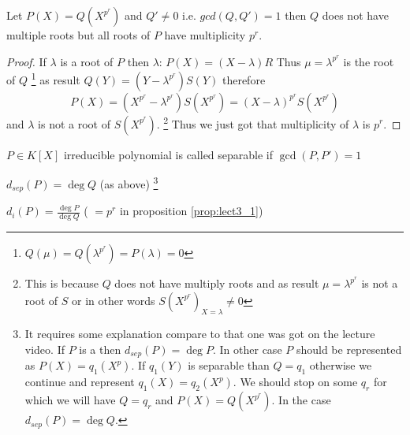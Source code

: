 \begin{proposition}
  Let $P\left(X\right) = Q\left(X^{p^r}\right)$ and $Q' \ne 0$ i.e.
  $gcd(Q, Q') = 1$ then $Q$ does not have multiple roots but
  all roots of $P$ have multiplicity $p^r$.
  \begin{proof}
    If $\lambda$ is a root of $P$ then $\lambda$:
    $P(X) = (X - \lambda)R$
    Thus $\mu = \lambda^{p^r}$ is the root of $Q$
    \footnote{
      $Q\left(\mu\right) = Q\left(\lambda^{p^r}\right) =
      P\left(\lambda\right) = 0$
    }
    as result
    $Q(Y) = (Y - \lambda^{p^r}) S(Y)$ therefore
    \[
    P(X) =
    \left(X^{p^r} - \lambda^{p^r}\right)S\left(X^{p^r}\right) =
    \left(X - \lambda\right)^{p^r}S\left(X^{p^r}\right)
    \]
    and $\lambda$ is not a root of $S\left(X^{p^r}\right)$.
    \footnote{
      This is because $Q$ does not have multiply roots and as result
      $\mu = \lambda^{p^r}$ is not a root of $S$ or in other words
      $S\left(X^{p^r}\right)_{X=\lambda} \ne 0$
      }
    Thus we just got that multiplicity of $\lambda$ is $p^r$.
  \end{proof}
  \label{prop:lect3_1}
\end{proposition}

\begin{definition}
  $P\in K\left[X\right]$ irreducible polynomial is called separable if
  $\gcd\left(P, P'\right) = 1$
  \label{def:separablepolynomial}
\end{definition}

\begin{definition}
  $d_{sep}(P) = \deg Q$ (as above)
  \footnote{    
    It requires some explanation compare to that one was got on the
    lecture video.
    If $P$ is a  then
    $d_{sep}(P) = \deg P$. In other case $P$ should be represented as
    $P\left(X\right) = q_1(X^p)$. If $q_1\left(Y\right)$ is separable
    than $Q = q_1$ otherwise we continue and represent
    $q_1\left(X\right) = q_2\left(X^p\right)$. We should stop on some
    $q_r$ for which we will have $Q = q_r$ and $P\left(X\right) =
    Q\left(X^{p^r}\right)$. In the case $d_{sep}(P) = \deg Q$.
  }
  \label{def:degsep}
\end{definition}

\begin{definition}
  $d_{i}(P) = \frac{\deg P}{\deg Q}$ ( $=p^r$ in proposition
  \ref{prop:lect3_1})  
  \label{def:deginsep}
\end{definition}

